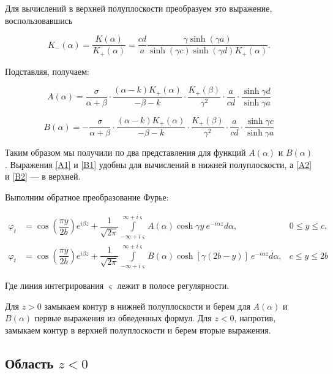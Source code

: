 \documentclass[a4paper,12pt]{article}
\begin{document}
Для вычислений в верхней полуплоскости преобразуем это выражение, воспользовавшись

\[
K_-(\alpha) = \dfrac{K(\alpha)}{K_+(\alpha)}=\dfrac{cd}{a} \dfrac{\gamma \sinh(\gamma a)}{\sinh(\gamma c) \sinh (\gamma d) K_+(\alpha)}.
\]

Подставляя, получаем:

\begin{equation}
\boxed{
A(\alpha) = \dfrac{\sigma}{\alpha + \beta} \cdot \dfrac{(\alpha - k) K_+(\alpha)}{-\beta - k} \cdot \dfrac{K_+(\beta)}{\gamma^2}\cdot\dfrac{a}{cd} \cdot \dfrac{\sinh{\gamma d}}{\sinh{\gamma a}}
} \label{A2}
\end{equation}

\begin{equation}
\boxed{
B(\alpha) = - \dfrac{\sigma}{\alpha + \beta} \cdot \dfrac{(\alpha - k) K_+(\alpha)}{-\beta - k} \cdot \dfrac{K_+(\beta)}{\gamma^2}\cdot\dfrac{a}{cd} \cdot \dfrac{\sinh{\gamma c}}{\sinh{\gamma a}}
} \label{B2}
\end{equation}

Таким образом мы получили по два представления для функций $A(\alpha)$ и $B(\alpha)$. Выражения \ref{A1} и \ref{B1} удобны для вычислений в нижней полуплоскости, а \ref{A2} и \ref{B2} --- в верхней.

Выполним обратное преобразование Фурье:

\begin{align}
\varphi_t &= \cos\!\left(\dfrac{\pi y}{2b}\right)e^{i\beta z} + \dfrac{1}{\sqrt{2\pi}} \int \limits_{-\infty + i\varsigma}^{\infty+ i\varsigma} A(\alpha) \cosh{\gamma y} \ e^{-i\alpha z} d \alpha, &0 \leq y \leq c, \label{rev_fourier_1}\\
\varphi_t &= \cos\!\left(\dfrac{\pi y}{2b}\right)e^{i\beta z} + \dfrac{1}{\sqrt{2\pi}} \int \limits_{-\infty + i\varsigma}^{\infty+ i\varsigma} B(\alpha) \cosh{[\gamma(2b - y)]} \ e^{-i\alpha z} d \alpha, &c \leq y \leq 2b
\end{align}

Где линия интегрирования $\varsigma$ лежит в полосе регулярности.

Для $z > 0$ замыкаем контур в нижней полуплоскости и берем для $A(\alpha)$ и $B(\alpha)$ первые выражения из обведенных формул. Для $z<0$, напротив, замыкаем контур в верхней полуплоскости и берем вторые выражения.

\subsection*{Область $z<0$}
\end{document}
